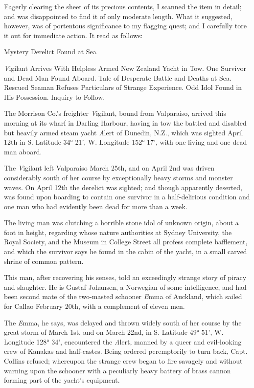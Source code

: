 Eagerly clearing the sheet of its precious contents, I scanned the item in detail; and was disappointed to find it of only moderate length. What it suggested, however, was of portentous significance to my flagging quest; and I carefully tore it out for immediate action. It read as follows:

\beginblockquote
Mystery Derelict Found at Sea

{\emph Vigilant} Arrives With Helpless Armed New Zealand Yacht in Tow. One Survivor and Dead Man Found Aboard. Tale of Desperate Battle and Deaths at Sea. Rescued Seaman Refuses Particulars of Strange Experience. Odd Idol Found in His Possession. Inquiry to Follow.

\sectionbreak

The Morrison Co.’s freighter {\emph Vigilant}, bound from Valparaiso, arrived this morning at its wharf in Darling Harbour, having in tow the battled and disabled but heavily armed steam yacht {\emph Alert} of Dunedin, N.Z., which was sighted April 12th in S. Latitude 34° 21', W. Longitude 152° 17', with one living and one dead man aboard.

The {\emph Vigilant} left Valparaiso March 25th, and on April 2nd was driven considerably south of her course by exceptionally heavy storms and monster waves. On April 12th the derelict was sighted; and though apparently deserted, was found upon boarding to contain one survivor in a half-delirious condition and one man who had evidently been dead for more than a week.

The living man was clutching a horrible stone idol of unknown origin, about a foot in height, regarding whose nature authorities at Sydney University, the Royal Society, and the Museum in College Street all profess complete bafflement, and which the survivor says he found in the cabin of the yacht, in a small carved shrine of common pattern.

This man, after recovering his senses, told an exceedingly strange story of piracy and slaughter. He is Gustaf Johansen, a Norwegian of some intelligence, and had been second mate of the two-masted schooner {\emph Emma} of Auckland, which sailed for Callao February 20th, with a complement of eleven men.

The {\emph Emma}, he says, was delayed and thrown widely south of her course by the great storm of March 1st, and on March 22nd, in S. Latitude 49° 51', W. Longitude 128° 34', encountered the {\emph Alert}, manned by a queer and evil-looking crew of Kanakas and half-castes. Being ordered peremptorily to turn back, Capt. Collins refused; whereupon the strange crew began to fire savagely and without warning upon the schooner with a peculiarly heavy battery of brass cannon forming part of the yacht’s equipment.


